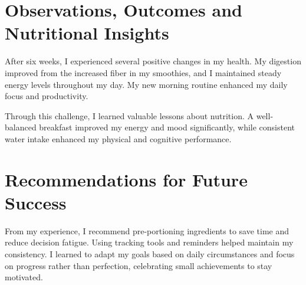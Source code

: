 \documentclass[11pt]{article}
\begin{document}
\section*{Observations, Outcomes and Nutritional Insights}\vspace{-1em}
After six weeks, I experienced several positive changes in my health. My digestion improved from the increased fiber in my smoothies, and I maintained steady energy levels throughout my day. My new morning routine enhanced my daily focus and productivity.

Through this challenge, I learned valuable lessons about nutrition. A well-balanced breakfast improved my energy and mood significantly, while consistent water intake enhanced my physical and cognitive performance.

\section*{Recommendations for Future Success}\vspace{-1em}
From my experience, I recommend pre-portioning ingredients to save time and reduce decision fatigue. Using tracking tools and reminders helped maintain my consistency. I learned to adapt my goals based on daily circumstances and focus on progress rather than perfection, celebrating small achievements to stay motivated.
\end{document}
